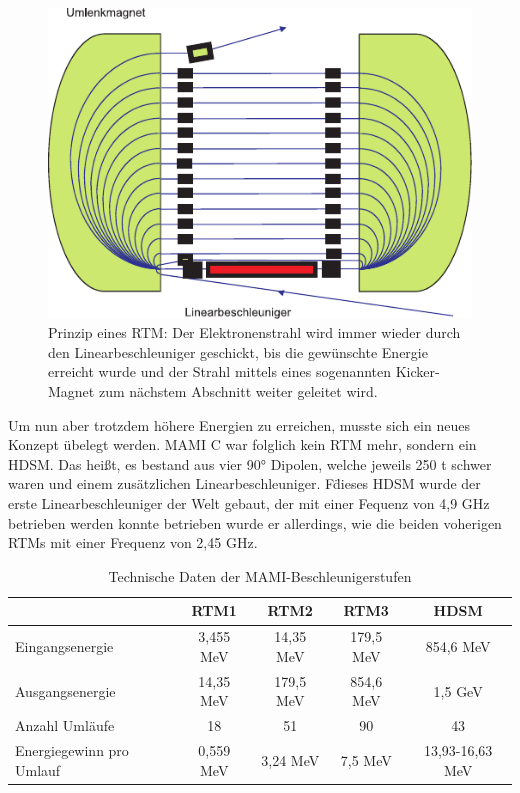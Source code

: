 \documentclass[a4paper,11pt,oneside,final,german,openbib,pdftex]{scrbook}
\begin{document}
\begin{figure}[h]
	\begin{center}
	\includegraphics{RTM}	
	\caption{Prinzip eines RTM: Der Elektronenstrahl wird immer wieder durch den Linearbeschleuniger geschickt, bis die gew\"unschte Energie erreicht wurde und der Strahl mittels eines sogenannten Kicker-Magnet zum n\"achstem Abschnitt weiter geleitet wird. }
	\label{fig.RTM}
\end{center}
\end{figure}

Um nun aber trotzdem h\"ohere Energien zu erreichen, musste sich ein neues Konzept \"ubelegt werden. MAMI C war folglich kein RTM mehr, sondern ein HDSM. Das hei{\ss}t, es bestand aus vier 90° Dipolen, welche jeweils 250 t schwer waren und einem zus\"atzlichen Linearbeschleuniger. F\" dieses HDSM wurde der erste Linearbeschleuniger der Welt gebaut, der mit einer Fequenz von 4,9 GHz betrieben werden konnte betrieben wurde er allerdings, wie die beiden voherigen RTMs mit einer Frequenz von 2,45 GHz.
\newline
\begin{table}[h]
	\begin{center}
		\begin{tabular}{|l|c|c|c|c|}
			\hline
			& RTM1 & RTM2 & RTM3 & HDSM \\
			\hline
			\hline
			Eingangsenergie &3,455 MeV  &  14,35 MeV& 179,5 MeV  &854,6 MeV \\ \hline
			Ausgangsenergie &14,35 MeV  &  179,5 MeV &854,6 MeV  & 1,5 GeV \\ \hline
			Anzahl Uml\"aufe&18  &51  &90  &43 \\ \hline
			Energiegewinn pro Umlauf &0,559 MeV  & 3,24 MeV & 7,5 MeV  & 13,93-16,63 MeV \\ \hline
			
	
		\end{tabular}
		\caption{Technische Daten der MAMI-Beschleunigerstufen \cite{Un08}}
		\label{tab.MAMIstufen}
	\end{center}
\end{table}
\end{document}
